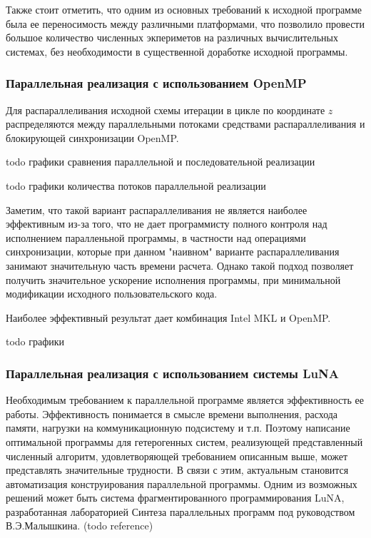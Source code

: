 Также стоит отметить, что одним из основных требований к исходной программе была ее переносимость между различными платформами,
что позволило провести большое количество численных экпериметов на различных вычислительных системах,
без необходимости в существенной доработке исходной программы.

\subsubsection{Параллельная реализация с использованием OpenMP}

Для распараллеливания исходной схемы итерации в цикле по координате $z$ распределяются между параллельными потоками средствами распараллеливания и блокирующей синхронизации OpenMP.

todo графики сравнения параллельной и последовательной реализации

todo графики количества потоков параллельной реализации

Заметим, что такой вариант распараллеливания не является наиболее эффективным из-за того, что не дает программисту полного контроля
над исполнением паралленьной программы, в частности над операциями синхронизации, которые при данном "наивном" варианте распараллеливания
занимают значительную часть времени расчета. Однако такой подход позволяет получить значительное ускорение исполнения программы,
при минимальной модификации исходного пользовательского кода.

Наиболее эффективный результат дает комбинация Intel MKL и OpenMP.

todo графики

\subsubsection{Параллельная реализация с использованием системы LuNA}

Необходимым требованием к параллельной программе является эффективность ее работы. Эффективность понимается в смысле времени выполнения,
расхода памяти, нагрузки на коммуникационную подсистему и т.п.
Поэтому написание оптимальной программы для гетерогенных систем, реализующей представленный численный алгоритм,
удовлетворяющей требованием описанным выше, может представлять значительные трудности.
В связи с этим, актуальным становится автоматизация конструирования параллельной программы.
Одним из возможных решений может быть система фрагментированного программирования LuNA,
разработанная лабораторией Синтеза параллельных программ под руководством В.Э.Малышкина. (todo reference)

